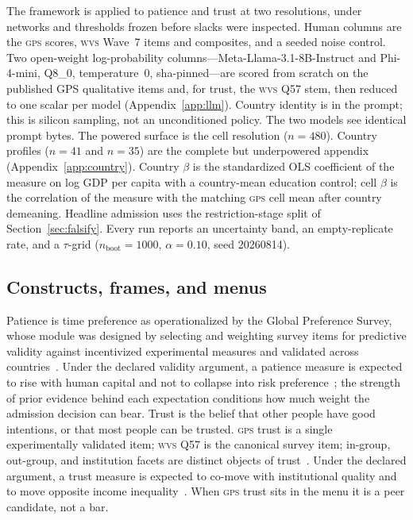 \documentclass[10pt,letterpaper]{article}
\newcommand{\GPS}{\textsc{gps}}
\newcommand{\WVS}{\textsc{wvs}}
\begin{document}
The framework is applied to patience and trust at two resolutions, under networks and thresholds frozen before slacks were inspected.
Human columns are the \GPS{} scores, \WVS{} Wave~7 items and composites, and a seeded noise control.
Two open-weight log-probability columns---Meta-Llama-3.1-8B-Instruct and Phi-4-mini, Q8\_0, temperature~0, sha-pinned---are scored from scratch on the published GPS qualitative items and, for trust, the \WVS{} Q57 stem, then reduced to one scalar per model (Appendix~\ref{app:llm}).
Country identity is in the prompt; this is silicon sampling, not an unconditioned policy.
The two models see identical prompt bytes.
The powered surface is the cell resolution ($n=480$).
Country profiles ($n=41$ and $n=35$) are the complete but underpowered appendix (Appendix~\ref{app:country}).
Country $\beta$ is the standardized OLS coefficient of the measure on log GDP per capita with a country-mean education control; cell $\beta$ is the correlation of the measure with the matching \GPS{} cell mean after country demeaning.
Headline admission uses the restriction-stage split of Section~\ref{sec:falsify}.
Every run reports an uncertainty band, an empty-replicate rate, and a $\tau$-grid ($n_{\mathrm{boot}}=1000$, $\alpha=0.10$, seed 20260814).

\subsection{Constructs, frames, and menus}
\label{sec:app-construct}

Patience is time preference as operationalized by the Global Preference Survey, whose module was designed by selecting and weighting survey items for predictive validity against incentivized experimental measures and validated across countries~\cite{falk2018,falk2023}.
Under the declared validity argument, a patience measure is expected to rise with human capital and not to collapse into risk preference~\cite{dohmen2011}; the strength of prior evidence behind each expectation conditions how much weight the admission decision can bear.
Trust is the belief that other people have good intentions, or that most people can be trusted.
\GPS{} trust is a single experimentally validated item; \WVS{} Q57 is the canonical survey item; in-group, out-group, and institution facets are distinct objects of trust~\cite{butler2016,glaser2000,sapienza2013}.
Under the declared argument, a trust measure is expected to co-move with institutional quality and to move opposite income inequality~\cite{aghion2010,bjornskov2008}.
When \GPS{} trust sits in the menu it is a peer candidate, not a bar.
\end{document}
